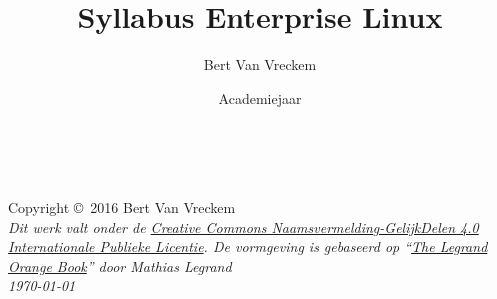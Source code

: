 \documentclass[11pt,fleqn,a4paper]{book}
\author{Bert Van Vreckem}
\title{Syllabus Enterprise Linux}
\date{Academiejaar \acadj}
\begin{document}
\thetitlepage


\newpage
~\vfill
\thispagestyle{empty}

\noindent Copyright \copyright\ 2016 Bert Van Vreckem\\ %

\noindent \textit{Dit werk valt onder de \href{http://creativecommons.org/licenses/by-sa/4.0/}{Creative Commons Naamsvermelding-GelijkDelen 4.0 Internationale Publieke Licentie}. De vormgeving is gebaseerd op ``\href{http://www.latextemplates.com/template/the-legrand-orange-book}{The Legrand Orange Book}'' door Mathias Legrand}\\

\noindent \textit{\today} %

\usechapterimagefalse

\tableofcontents %

\cleardoublepage %




\printbibliography[notkeyword=voorbeeld]
\end{document}
